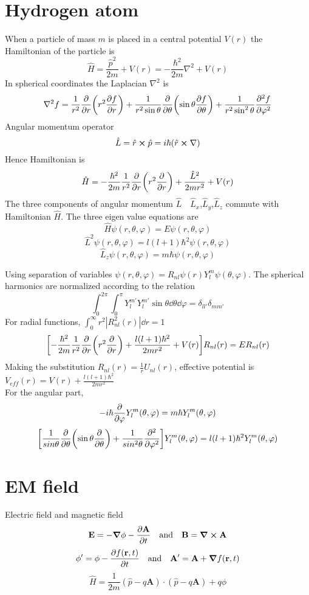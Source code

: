 \documentclass[12pt]{article}
\begin{document}
\section{Hydrogen atom}
When a particle of mass $m$ is placed in a central potential $V(r)$ the Hamiltonian of the particle is \[\hat{H}=\frac{\hat{p}^2}{2m}+V(r)=-\frac{\hbar^2}{2m}\nabla^2+V(r)\] 
In spherical coordinates the Laplacian $\nabla^2$ is \[\nabla^2f=\frac{1}{r^2}\pdv{r}\qty(r^2\pdv{f}{r})+\frac{1}{r^2\sin\theta}\pdv{\theta}\qty(\sin\theta\pdv{f}{\theta})+\frac{1}{r^2\sin^2\theta}\pdv[2]{f}{\varphi}\] 
Angular momentum operator \[\hat{L}=\hat{r}\cp\hat{p}=i\hbar(\hat{r}\cp\nabla)\]
Hence Hamiltonian is \[\hat{H}=-\frac{\hbar^2}{2m}\frac{1}{r^2}\pdv{r}\qty(r^2\pdv{r})+\frac{\hat{L}^2}{2mr^2}+V(r)\]
The three components of angular momentum $\hat{L}\quad$$\hat{L}_x$,$\hat{L}_y$,$\hat{L}_z$ commute with Hamiltonian $\hat{H}$.
The three eigen value equations are 
\[\hat{H}\psi(r,\theta,\varphi)=E\psi(r,\theta,\varphi)\]
\[\hat{L}^2\psi(r,\theta,\varphi)=l(l+1)\hbar^2\psi(r,\theta,\varphi)\]
\[\hat{L}_z\psi(r,\theta,\varphi)=m\hbar\psi(r,\theta,\varphi)\]

Using separation of variables $\psi(r,\theta,\varphi)=R_{nl}\psi(r)Y^m_l\psi(\theta,\varphi)$.
The spherical harmonics are normalized according to the relation \[\int_{0}^{2\pi}\int_{0}^{\pi}Y^{m'}_{l}Y^{m'}_{l}\sin\theta\dd\theta\dd\varphi=\delta_{ll'}\delta_{mm'}\]
For radial functions, $\int_{0}^{\infty}r^2|R_{nl}^2(r)|\dd{r}=1$
\[\qty[-\frac{\hbar^2}{2m}\frac{1}{r^2}\pdv{r}\qty(r^2\pdv{r})+\frac{l(l+1)\hbar^2}{2mr^2}+V(r)]R_{nl}(r)=ER_{nl}(r)\]
Making the substitution $R_{nl}(r)=\frac{1}{r}U_{nl}(r)$, effective potential is $V_{eff}(r)=V(r)+\frac{l(l+1)\hbar^2}{2mr^2}$
\\
For the angular part, \[-i\hbar\pdv{\varphi}Y^m_l(\theta,\varphi)=m\hbar Y^m_l(\theta,\varphi)\]
\[\qty[\frac{1}{sin\theta}\pdv{\theta}\qty(\sin\theta\pdv{\theta})+\frac{1}{sin^2\theta}\pdv[2]{\varphi}]Y^m_l(\theta,\varphi)=l(l+1)\hbar^2 Y^m_l(\theta,\varphi)\]
\section{EM field}
Electric field and magnetic field \[\vb{E}=-\grad{\phi}-\pdv{\vb{A}}{t}\qq{and}\vb{B}=\curl{\vb{A}}\]
\[\phi'=\phi-\pdv{f(\vb{r},t)}{t}\qq{and}\vb{A'}=\vb{A}+\grad{f(\vb{r},t)}\]
\[\hat{H}=\frac{1}{2m}(\hat{p}-q\mathbf{A})\cdot(\hat{p}-q\mathbf{A})+ q\phi\]
\end{document}
